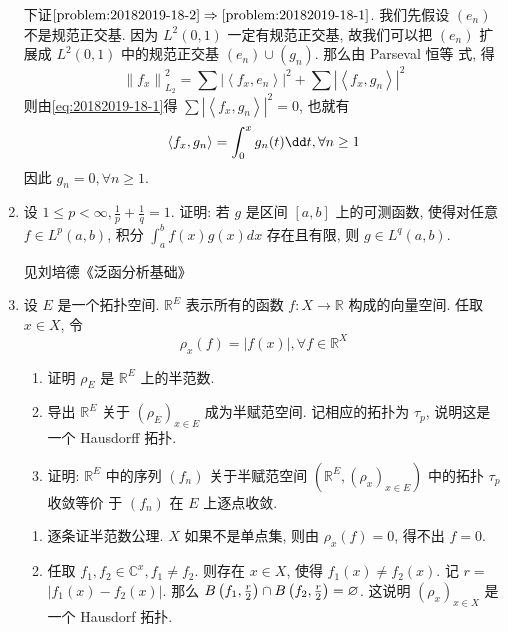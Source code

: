 \begin{enumerate}
\begin{answer}
                下证$\ref{problem:20182019-18-2} \Rightarrow \ref{problem:20182019-18-1}$. 我们先假设 $\left(e_{n}\right)$ 不是规范正交基. 因为 $L^{2}(0,1)$ 一定有规范正交基, 故我们可以把 $\left(e_{n}\right)$ 扩展成 $L^{2}(0,1)$ 中的规范正交基 $\left(e_{n}\right) \cup\left(g_{n}\right)$. 那么由 Parseval 恒等 式, 得
                \[
                \left\|f_{x}\right\|_{L_{2}}^{2}=\sum\left|\left\langle f_{x}, e_{n}\right\rangle\right|^{2}+\sum\left|\left\langle f_{x}, g_{n}\right\rangle\right|^{2}
                \]
                则由\cref{eq:20182019-18-1}得 $\sum\left|\left\langle f_{x}, g_{n}\right\rangle\right|^{2}=0$, 也就有
                \[
                \left\langle f_{x}, g_{n}\right\rangle=\int_{0}^{x} g_{n}(t) \dt, \forall n \geq 1
                \]
                因此 $g_{n}=0, \forall n \geq 1$.
        \end{answer}
    \item 设 $1 \leq p<\infty, \frac{1}{p}+\frac{1}{q}=1$. 证明: 若 $g$ 是区间 $[a, b]$ 上的可测函数, 使得对任意 $f \in L^{p}(a, b)$, 积分 $\int_{a}^{b} f(x) g(x) d x$ 存在且有限, 则 $g \in L^{q}(a, b)$.
        \begin{answer}
            见刘培德《泛函分析基础》
        \end{answer}
    \item 设 $E$ 是一个拓扑空间. $\mathbb{R}^{E}$ 表示所有的函数 $f: X \rightarrow \mathbb{R}$ 构成的向量空间. 任取 $x \in X$, 令
    \[
    \rho_{x}(f)=|f(x)|, \forall f \in \mathbb{R}^{X}
    \]
        \begin{enumerate}
            \item 证明 $\rho_{E}$ 是 $\mathbb{R}^{E}$ 上的半范数.
            \item 导出 $\mathbb{R}^{E}$ 关于 $\left(\rho_{E}\right)_{x \in E}$ 成为半赋范空间. 记相应的拓扑为 $\tau_{p}$, 说明这是一个 Hausdorff 拓扑.
            \item 证明: $\mathbb{R}^{E}$ 中的序列 $\left(f_{n}\right)$ 关于半赋范空间 $\left(\mathbb{R}^{E},\left(\rho_{x}\right)_{x \in E}\right)$ 中的拓扑 $\tau_{p}$ 收敛等价 于 $\left(f_{n}\right)$ 在 $E$ 上逐点收敛.
        \end{enumerate}
        \begin{answer}
            \begin{enumerate}
                \item 逐条证半范数公理. $X$ 如果不是单点集, 则由 $\rho_{x}(f)=0$, 得不出 $f=0 .$
                \item 任取 $f_{1}, f_{2} \in \mathbb{C}^{x}, f_{1} \neq  f_{2}$. 则存在 $x \in X$, 使得 $f_{1}(x) \neq  f_{2}(x)$. 记 $r=$ $\left|f_{1}(x)-f_{2}(x)\right|$. 那么 $B\left(f_{1}, \frac{r}{2}\right) \cap B\left(f_{2}, \frac{r}{2}\right)=\varnothing$. 这说明 $\left(\rho_{x}\right)_{x \in X}$ 是一个 Hausdorf 拓扑.

\end{enumerate}
\end{answer}
\end{enumerate}
